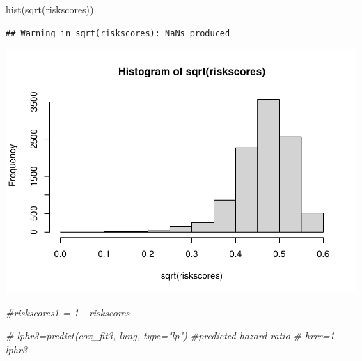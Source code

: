 \documentclass[
  11pt,
]{article}
\newenvironment{Shaded}{\begin{snugshade}}{\end{snugshade}}
\newcommand{\CommentTok}[1]{\textcolor[rgb]{0.56,0.35,0.01}{\textit{#1}}}
\newcommand{\FunctionTok}[1]{\textcolor[rgb]{0.00,0.00,0.00}{#1}}
\newcommand{\NormalTok}[1]{#1}
\begin{document}
\begin{Shaded}
\begin{Highlighting}[]
\FunctionTok{hist}\NormalTok{(}\FunctionTok{sqrt}\NormalTok{(riskscores))}
\end{Highlighting}
\end{Shaded}

\begin{verbatim}
## Warning in sqrt(riskscores): NaNs produced
\end{verbatim}

\includegraphics{Hazard_and_Risk_plot_updated_files/figure-latex/unnamed-chunk-12-1.pdf}

\begin{Shaded}
\begin{Highlighting}[]
\CommentTok{\#riskscores1 = 1 {-} riskscores}
\end{Highlighting}
\end{Shaded}

\begin{Shaded}
\begin{Highlighting}[]
\CommentTok{\# lphr3=predict(cox\_fit3, lung, type="lp") \#predicted hazard ratio}
\CommentTok{\# hrrr=1{-}lphr3}
\end{Highlighting}
\end{Shaded}
\end{document}
